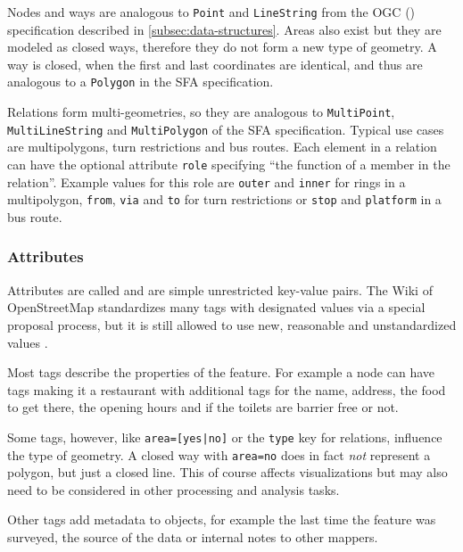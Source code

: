 			Nodes and ways are analogous to \texttt{Point} and \texttt{LineString} from the OGC  () specification described in \cref{subsec:data-structures}.
			Areas also exist but they are modeled as closed ways, therefore they do not form a new type of geometry.
			A way is closed, when the first and last coordinates are identical, and thus are analogous to a \texttt{Polygon} in the SFA specification.
			
			Relations form multi-geometries, so they are analogous to \texttt{MultiPoint}, \texttt{MultiLineString} and \texttt{MultiPolygon} of the SFA specification.
			Typical use cases are multipolygons, turn restrictions and bus routes.
			Each element in a relation can have the optional attribute \texttt{role} specifying \enquote{the function of a member in the relation}\cite{osm-wiki-relation}.
			Example values for this role are \texttt{outer} and \texttt{inner} for rings in a multipolygon, \texttt{from}, \texttt{via} and \texttt{to} for turn restrictions or \texttt{stop} and \texttt{platform} in a bus route.
			
		\subsubsection{Attributes}
		\label{subsubsec:osm-attributes}
			
			Attributes are called  and are simple unrestricted key-value pairs.
			The Wiki of OpenStreetMap standardizes many tags with designated values via a special proposal process, but it is still allowed to use new, reasonable and unstandardized values \cite{osm-wiki-proposal-process}.
			
			Most tags describe the properties of the feature.
			For example a node can have tags making it a restaurant with additional tags for the name, address, the food to get there, the opening hours and if the toilets are barrier free or not.
			
			Some tags, however, like \texttt{area=[yes|no]} or the \texttt{type} key for relations, influence the type of geometry.
			A closed way with \texttt{area=no} does in fact \textit{not} represent a polygon, but just a closed line.
			This of course affects visualizations but may also need to be considered in other processing and analysis tasks.
			
			Other tags add metadata to objects, for example the last time the feature was surveyed, the source of the data or internal notes to other mappers.
			
